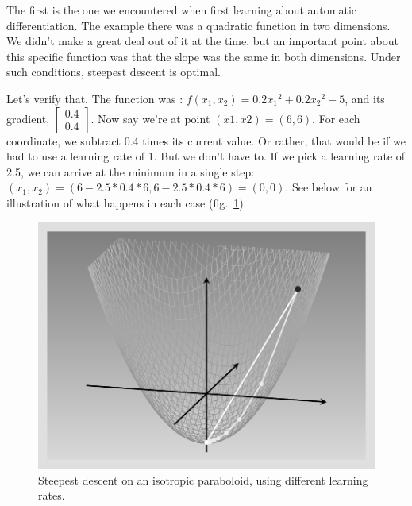 \documentclass[
  letterpaper,
]{krantz}
\begin{document}
The first is the one we encountered when first learning about automatic
differentiation. The example there was a quadratic function in two
dimensions. We didn't make a great deal out of it at the time, but an
important point about this specific function was that the slope was the
same in both dimensions. Under such conditions, steepest descent is
optimal.

Let's verify that. The function was :
\(f(x_1, x_2) = 0.2 {x_1}^2 + 0.2 {x_2}^2 - 5\), and its gradient,
\(\begin{bmatrix}0.4\\0.4 \end{bmatrix}\). Now say we're at point
\((x1, x2) = (6,6)\). For each coordinate, we subtract 0.4 times its
current value. Or rather, that would be if we had to use a learning rate
of 1. But we don't have to. If we pick a learning rate of 2.5, we can
arrive at the minimum in a single step:
\((x_1, x_2) = (6 - 2.5*0.4*6, 6 - 2.5*0.4*6) = (0,0)\). See below for
an illustration of what happens in each case
(fig.~\ref{fig-optimizers-steepest-descent-symmetric}).

\begin{figure}[H]

{\centering \includegraphics{images/optimizers-steepest-descent-symmetric.png}

}

\caption{\label{fig-optimizers-steepest-descent-symmetric}Steepest
descent on an isotropic paraboloid, using different learning rates.}

\end{figure}
\end{document}
